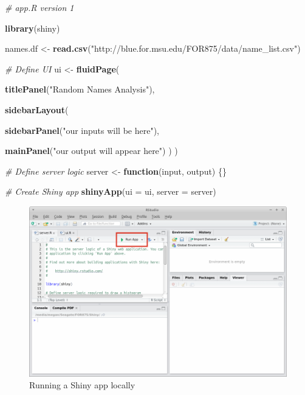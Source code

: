 \documentclass[]{krantz}
\makeatletter
\newenvironment{Shaded}{\begin{snugshade}}{\end{snugshade}}
\newcommand{\KeywordTok}[1]{\textcolor[rgb]{0.27,0.27,0.27}{\textbf{#1}}}
\newcommand{\DataTypeTok}[1]{\textcolor[rgb]{0.27,0.27,0.27}{#1}}
\newcommand{\StringTok}[1]{\textcolor[rgb]{0.5,0.5,0.5}{#1}}
\newcommand{\CommentTok}[1]{\textcolor[rgb]{0.37,0.37,0.37}{\textit{#1}}}
\newcommand{\ControlFlowTok}[1]{\textcolor[rgb]{0.27,0.27,0.27}{\textbf{#1}}}
\newcommand{\NormalTok}[1]{#1}
\newenvironment{kframe}{%
\medskip{}
\setlength{\fboxsep}{.8em}
 \def\at@end@of@kframe{}%
 \ifinner\ifhmode%
  \def\at@end@of@kframe{\end{minipage}}%
  \begin{minipage}{\columnwidth}%
 \fi\fi%
 \def\FrameCommand##1{\hskip\@totalleftmargin \hskip-\fboxsep
 \colorbox{shadecolor}{##1}\hskip-\fboxsep
     \hskip-\linewidth \hskip-\@totalleftmargin \hskip\columnwidth}%
 \MakeFramed {\advance\hsize-\width
   \@totalleftmargin\z@ \linewidth\hsize
   \@setminipage}}%
 {\par\unskip\endMakeFramed%
 \at@end@of@kframe}
\renewenvironment{Shaded}{\begin{kframe}}{\end{kframe}}
\makeatother
\begin{document}
\begin{Shaded}
\begin{Highlighting}[]
\CommentTok{# app.R version 1}

\KeywordTok{library}\NormalTok{(shiny)}

\NormalTok{names.df <-}\StringTok{ }\KeywordTok{read.csv}\NormalTok{(}\StringTok{"http://blue.for.msu.edu/FOR875/data/name_list.csv"}\NormalTok{)}

\CommentTok{# Define UI}
\NormalTok{ui <-}\StringTok{ }\KeywordTok{fluidPage}\NormalTok{(}
  
  \KeywordTok{titlePanel}\NormalTok{(}\StringTok{"Random Names Analysis"}\NormalTok{),}
  
  \KeywordTok{sidebarLayout}\NormalTok{(}
    
    \KeywordTok{sidebarPanel}\NormalTok{(}\StringTok{"our inputs will be here"}\NormalTok{),}
    
    \KeywordTok{mainPanel}\NormalTok{(}\StringTok{"our output will appear here"}\NormalTok{)}
\NormalTok{  )}
\NormalTok{)}

\CommentTok{# Define server logic}
\NormalTok{server <-}\StringTok{ }\ControlFlowTok{function}\NormalTok{(input, output) \{\}}

\CommentTok{# Create Shiny app}
\KeywordTok{shinyApp}\NormalTok{(}\DataTypeTok{ui =}\NormalTok{ ui, }\DataTypeTok{server =}\NormalTok{ server)}
\end{Highlighting}
\end{Shaded}

\begin{figure}
\includegraphics[width=1\linewidth]{../figures/RStudio_runApp} \caption{Running a Shiny app locally}\label{fig:fig1}
\end{figure}
\end{document}
